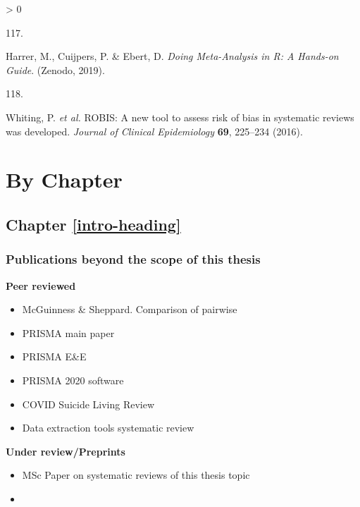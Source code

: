 \documentclass[a4paper, twoside]{templates/ociamthesis}
\newlength{\cslhangindent}
\newlength{\csllabelwidth}
\newenvironment{CSLReferences}[3] %
 {%
  \setlength{\parindent}{0pt}
  \ifodd #1 \everypar{\setlength{\hangindent}{\cslhangindent}}\ignorespaces\fi
  \ifnum #2 > 0
  \setlength{\parskip}{#2\baselineskip}
  \fi
 }%
 {}
\newcommand{\CSLLeftMargin}[1]{\parbox[t]{\maxof{\widthof{#1}}{\csllabelwidth}}{#1}}
\newcommand{\CSLRightInline}[1]{\parbox[t]{\linewidth - \csllabelwidth}{#1}}
\begin{document}
\begin{CSLReferences}{0}{0}
\leavevmode\hypertarget{ref-mathias_harrer_2019_2551803}{}%
\CSLLeftMargin{117. }
\CSLRightInline{Harrer, M., Cuijpers, P. \& Ebert, D. \emph{Doing {Meta}-{Analysis} in {R}: {A Hands}-on {Guide}}. ({Zenodo}, 2019).}

\leavevmode\hypertarget{ref-whiting2016robis}{}%
\CSLLeftMargin{118. }
\CSLRightInline{Whiting, P. \emph{et al.} {ROBIS}: A new tool to assess risk of bias in systematic reviews was developed. \emph{Journal of Clinical Epidemiology} \textbf{69}, 225--234 (2016).}

\end{CSLReferences}

\startappendices

\hypertarget{chapter-appendix-heading}{%
\chapter{By Chapter}\label{chapter-appendix-heading}}

\hypertarget{appendix-into}{%
\section{Chapter \ref{intro-heading}}\label{appendix-into}}

\hypertarget{appendix-publications}{%
\subsection{Publications beyond the scope of this thesis}\label{appendix-publications}}

\textbf{Peer reviewed}

\begin{itemize}
\item
  McGuinness \& Sheppard. Comparison of pairwise
\item
  PRISMA main paper
\item
  PRISMA E\&E
\item
  PRISMA 2020 software
\item
  COVID Suicide Living Review
\item
  Data extraction tools systematic review
\end{itemize}

\textbf{Under review/Preprints}

\begin{itemize}
\item
  MSc Paper on systematic reviews of this thesis topic
\item
\end{itemize}
\end{document}
